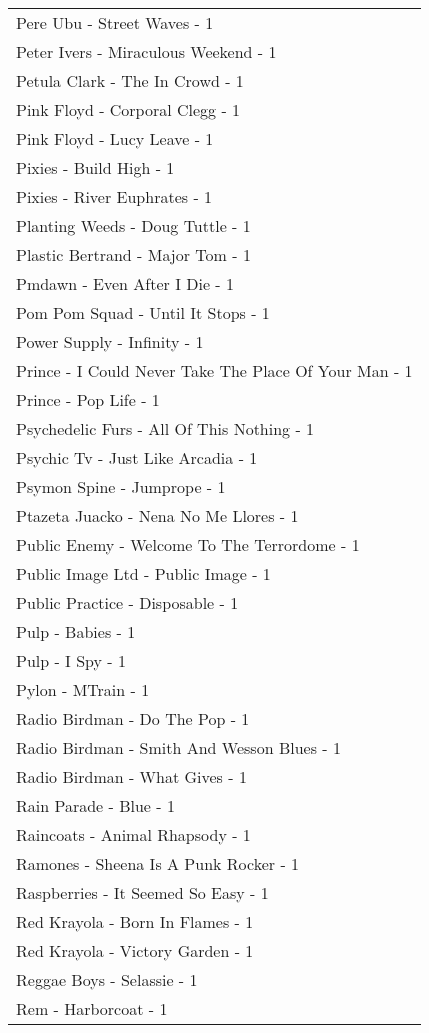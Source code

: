 \documentclass[
]{article}
\begin{document}
\begin{longtable}{l}
Pere Ubu - Street Waves - 1 \\ 
Peter Ivers - Miraculous Weekend - 1 \\ 
Petula Clark - The In Crowd - 1 \\ 
Pink Floyd - Corporal Clegg - 1 \\ 
Pink Floyd - Lucy Leave - 1 \\ 
Pixies - Build High - 1 \\ 
Pixies - River Euphrates - 1 \\ 
Planting Weeds - Doug Tuttle - 1 \\ 
Plastic Bertrand - Major Tom - 1 \\ 
Pmdawn - Even After I Die - 1 \\ 
Pom Pom Squad - Until It Stops - 1 \\ 
Power Supply - Infinity - 1 \\ 
Prince - I Could Never Take The Place Of Your Man - 1 \\ 
Prince - Pop Life - 1 \\ 
Psychedelic Furs - All Of This Nothing - 1 \\ 
Psychic Tv - Just Like Arcadia - 1 \\ 
Psymon Spine - Jumprope - 1 \\ 
Ptazeta Juacko - Nena No Me Llores - 1 \\ 
Public Enemy - Welcome To The Terrordome - 1 \\ 
Public Image Ltd - Public Image - 1 \\ 
Public Practice - Disposable - 1 \\ 
Pulp - Babies - 1 \\ 
Pulp - I Spy - 1 \\ 
Pylon - MTrain - 1 \\ 
Radio Birdman - Do The Pop - 1 \\ 
Radio Birdman - Smith And Wesson Blues - 1 \\ 
Radio Birdman - What Gives - 1 \\ 
Rain Parade - Blue - 1 \\ 
Raincoats - Animal Rhapsody - 1 \\ 
Ramones - Sheena Is A Punk Rocker - 1 \\ 
Raspberries - It Seemed So Easy - 1 \\ 
Red Krayola - Born In Flames - 1 \\ 
Red Krayola - Victory Garden - 1 \\ 
Reggae Boys - Selassie - 1 \\ 
Rem - Harborcoat - 1 \\ 

\end{longtable}
\end{document}
